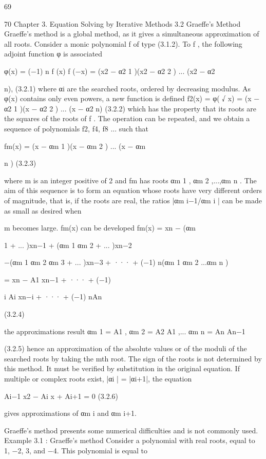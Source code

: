 \documentclass[letterpaper,12pt]{article}
\begin{document}
69

70 Chapter 3. Equation Solving by Iterative Methods
3.2 Graeffe’s Method
Graeffe’s method is a global method, as it gives a simultaneous approximation of all
roots.
Consider a monic polynomial f of type (3.1.2). To f , the following adjoint function
φ is associated

φ(x) = (−1)
n f (x) f (−x)
= (x2 − α2
1 )(x2 − α2
2 ) ... (x2 − α2

n), (3.2.1)
where αi are the searched roots, ordered by decreasing modulus. As φ(x) contains only
even powers, a new function is defined
f2(x) = φ(
√
x) = (x − α2
1 )(x − α2
2 ) ... (x − α2
n) (3.2.2)
which has the property that its roots are the squares of the roots of f . The operation
can be repeated, and we obtain a sequence of polynomials f2, f4, f8 ... such that

fm(x) = (x − αm
1 )(x − αm
2 ) ... (x − αm

n ) (3.2.3)

where m is an integer positive of 2 and fm has roots αm
1 , αm
2 ,...,αm
n . The aim of this
sequence is to form an equation whose roots have very different orders of magnitude,
that is, if the roots are real, the ratios |αm
i−1/αm
i | can be made as small as desired when

m becomes large.
fm(x) can be developed
fm(x) = xn − (αm

1 + ... )xn−1 + (αm
1 αm
2 + ... )xn−2

−(αm
1 αm
2 αm
3 + ... )xn−3 + ··· + (−1)
n(αm
1 αm
2 ...αm
n )

= xn − A1 xn−1 + ··· + (−1)

i Ai xn−i + ··· + (−1)
nAn

(3.2.4)

the approximations result
αm
1 = A1 , αm
2 = A2
A1
,... αm
n = An
An−1

(3.2.5)
hence an approximation of the absolute values or of the moduli of the searched roots
by taking the mth root.
The sign of the roots is not determined by this method. It must be verified by
substitution in the original equation.
If multiple or complex roots exist, |αi | = |αi+1|, the equation

Ai−1 x2 − Ai x + Ai+1 = 0 (3.2.6)

gives approximations of αm
i and αm
i+1.

Graeffe’s method presents some numerical difficulties and is not commonly used.
Example 3.1 :
Graeffe’s method
Consider a polynomial with real roots, equal to 1, −2, 3, and −4. This polynomial is equal to
\end{document}
